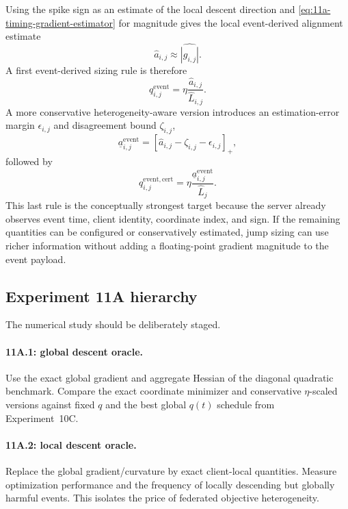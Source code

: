 Using the spike sign as an estimate of the local descent direction and \cref{eq:11a-timing-gradient-estimator} for magnitude gives the local event-derived alignment estimate
\begin{equation}
  \hat a_{i,j}
  \approx
  \widehat{|g_{i,j}|}.
\end{equation}
A first event-derived sizing rule is therefore
\begin{equation}
  q_{i,j}^{\mathrm{event}}
  =
  \eta\frac{\hat a_{i,j}}{\widehat L_{i,j}}.
  \label{eq:11a-event-q}
\end{equation}
A more conservative heterogeneity-aware version introduces an estimation-error margin $\epsilon_{i,j}$ and disagreement bound $\zeta_{i,j}$,
\begin{equation}
  \underline a_{i,j}^{\mathrm{event}}
  =
  [\hat a_{i,j}-\zeta_{i,j}-\epsilon_{i,j}]_+,
\end{equation}
followed by
\begin{equation}
  q_{i,j}^{\mathrm{event,cert}}
  =
  \eta\frac{\underline a_{i,j}^{\mathrm{event}}}{\widehat L_j}.
  \label{eq:11a-event-certified-q}
\end{equation}
This last rule is the conceptually strongest target because the server already observes event time, client identity, coordinate index, and sign. If the remaining quantities can be configured or conservatively estimated, jump sizing can use richer information without adding a floating-point gradient magnitude to the event payload.

\subsection{Experiment 11A hierarchy}

The numerical study should be deliberately staged.

\paragraph{11A.1: global descent oracle.}
Use the exact global gradient and aggregate Hessian of the diagonal quadratic benchmark. Compare the exact coordinate minimizer and conservative $\eta$-scaled versions against fixed $q$ and the best global $q(t)$ schedule from Experiment~10C.

\paragraph{11A.2: local descent oracle.}
Replace the global gradient/curvature by exact client-local quantities. Measure optimization performance and the frequency of locally descending but globally harmful events. This isolates the price of federated objective heterogeneity.

